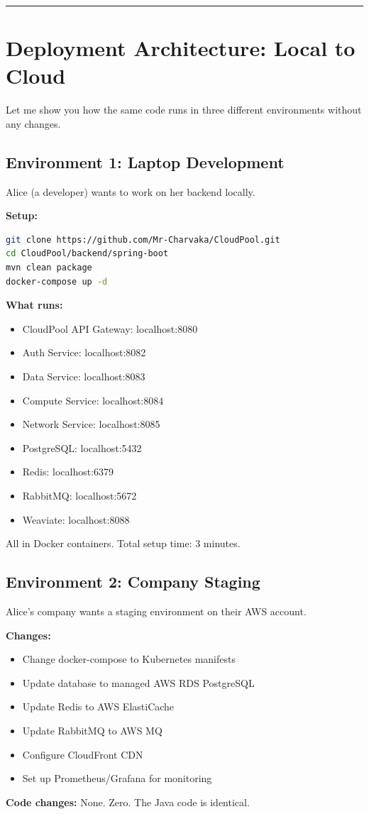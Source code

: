 \documentclass[11pt,a4paper]{report}
\begin{document}
\vfill\hrule\vfill



\chapter{Deployment Architecture: Local to Cloud}


Let me show you how the same code runs in three different environments without any changes.


\section{Environment 1: Laptop Development}


Alice (a developer) wants to work on her backend locally.

\textbf{Setup:}
\begin{lstlisting}[language=bash]
git clone https://github.com/Mr-Charvaka/CloudPool.git
cd CloudPool/backend/spring-boot
mvn clean package
docker-compose up -d
\end{lstlisting}

\textbf{What runs:}
\begin{itemize}
\item CloudPool API Gateway: localhost:8080
\item Auth Service: localhost:8082
\item Data Service: localhost:8083
\item Compute Service: localhost:8084
\item Network Service: localhost:8085
\item PostgreSQL: localhost:5432
\item Redis: localhost:6379
\item RabbitMQ: localhost:5672
\item Weaviate: localhost:8088

\end{itemize}
All in Docker containers. Total setup time: 3 minutes.


\section{Environment 2: Company Staging}


Alice's company wants a staging environment on their AWS account.

\textbf{Changes:} 
\begin{itemize}
\item Change docker-compose to Kubernetes manifests
\item Update database to managed AWS RDS PostgreSQL
\item Update Redis to AWS ElastiCache
\item Update RabbitMQ to AWS MQ
\item Configure CloudFront CDN
\item Set up Prometheus/Grafana for monitoring

\end{itemize}
\textbf{Code changes:} None. Zero. The Java code is identical.
\end{document}
